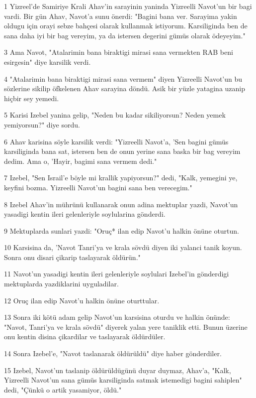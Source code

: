 \par 1 Yizreel'de Samiriye Krali Ahav'in sarayinin yaninda Yizreelli Navot'un bir bagi vardi. Bir gün Ahav, Navot'a sunu önerdi: "Bagini bana ver. Sarayima yakin oldugu için orayi sebze bahçesi olarak kullanmak istiyorum. Karsiliginda ben de sana daha iyi bir bag vereyim, ya da istersen degerini gümüs olarak ödeyeyim."
\par 3 Ama Navot, "Atalarimin bana biraktigi mirasi sana vermekten RAB beni esirgesin" diye karsilik verdi.
\par 4 "Atalarimin bana biraktigi mirasi sana vermem" diyen Yizreelli Navot'un bu sözlerine sikilip öfkelenen Ahav sarayina döndü. Asik bir yüzle yatagina uzanip hiçbir sey yemedi.
\par 5 Karisi Izebel yanina gelip, "Neden bu kadar sikiliyorsun? Neden yemek yemiyorsun?" diye sordu.
\par 6 Ahav karisina söyle karsilik verdi: "Yizreelli Navot'a, 'Sen bagini gümüs karsiliginda bana sat, istersen ben de onun yerine sana baska bir bag vereyim dedim. Ama o, 'Hayir, bagimi sana vermem dedi."
\par 7 Izebel, "Sen Israil'e böyle mi krallik yapiyorsun?" dedi, "Kalk, yemegini ye, keyfini bozma. Yizreelli Navot'un bagini sana ben verecegim."
\par 8 Izebel Ahav'in mührünü kullanarak onun adina mektuplar yazdi, Navot'un yasadigi kentin ileri gelenleriyle soylularina gönderdi.
\par 9 Mektuplarda sunlari yazdi: "Oruç* ilan edip Navot'u halkin önüne oturtun.
\par 10 Karsisina da, 'Navot Tanri'ya ve krala sövdü diyen iki yalanci tanik koyun. Sonra onu disari çikarip taslayarak öldürün."
\par 11 Navot'un yasadigi kentin ileri gelenleriyle soylulari Izebel'in gönderdigi mektuplarda yazdiklarini uyguladilar.
\par 12 Oruç ilan edip Navot'u halkin önüne oturttular.
\par 13 Sonra iki kötü adam gelip Navot'un karsisina oturdu ve halkin önünde: "Navot, Tanri'ya ve krala sövdü" diyerek yalan yere taniklik etti. Bunun üzerine onu kentin disina çikardilar ve taslayarak öldürdüler.
\par 14 Sonra Izebel'e, "Navot taslanarak öldürüldü" diye haber gönderdiler.
\par 15 Izebel, Navot'un taslanip öldürüldügünü duyar duymaz, Ahav'a, "Kalk, Yizreelli Navot'un sana gümüs karsiliginda satmak istemedigi bagini sahiplen" dedi, "Çünkü o artik yasamiyor, öldü."
